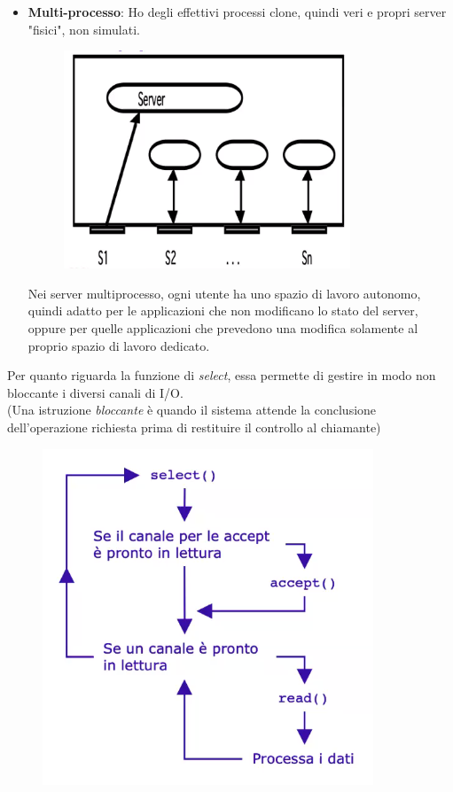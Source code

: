 \documentclass[12pt, a4paper]{article}
\begin{document}
\begin{itemize}
        \item \textbf{Multi-processo}:
        Ho degli effettivi processi clone, quindi veri e propri server "fisici", non simulati.

        \begin{figure}[htbp]
            \centering
            \includegraphics[scale=0.5]{multiprocesso.png}
            
            
        \end{figure}
        Nei server multiprocesso, ogni utente ha uno spazio di lavoro autonomo, quindi adatto
        per le applicazioni che non modificano lo stato del server, oppure per quelle applicazioni
        che prevedono una modifica solamente al proprio spazio di lavoro dedicato.
    \end{itemize}
    \newpage
    Per quanto riguarda la funzione di \textit{select}, essa permette di gestire in modo non bloccante
    i diversi canali di I/O.
    \\(Una istruzione \textit{bloccante} è quando il sistema attende la conclusione dell'operazione 
    richiesta prima di restituire il controllo al chiamante)

    \begin{figure}[htbp]
        \centering
        \includegraphics[scale=0.66]{select.png}
    \end{figure}
    
\end{document}
